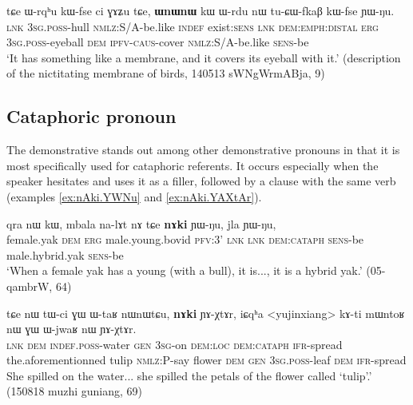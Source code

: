 \begin{exe}
\ex \label{ex:WnWnW.kW}
 \gll
tɕe ɯ-rqʰu kɯ-fse ci ɣɤʑu tɕe, \textbf{ɯnɯnɯ} kɯ ɯ-rdu nɯ tu-ɕɯ-fkaβ kɯ-fse ɲɯ-ŋu. \\
\textsc{lnk} \textsc{3sg.poss}-hull \textsc{nmlz}:S/A-be.like \textsc{indef}  exist:\textsc{sens} \textsc{lnk} \textsc{dem:emph:distal} \textsc{erg} \textsc{3sg.poss}-eyeball \textsc{dem} \textsc{ipfv}-\textsc{caus}-cover  \textsc{nmlz}:S/A-be.like \textsc{sens}-be \\
\glt `It has something like a membrane, and it covers its eyeball with it.' (description of the nictitating membrane of birds, 140513 sWNgWrmABja, 9)
\end{exe}

\subsection{Cataphoric pronoun} \label{sec:cataph.pron}
The demonstrative  stands out among other demonstrative pronouns in that it is most specifically used for cataphoric referents. It occurs especially when the speaker hesitates and uses it as a filler, followed by a clause with the same verb  (examples \ref{ex:nAki.YWNu} and \ref{ex:nAki.YAXtAr}).

\begin{exe}
\ex \label{ex:nAki.YWNu}
 \gll
qra nɯ kɯ, mbala na-lɤt nɤ tɕe \textbf{nɤki} ɲɯ-ŋu, jla ɲɯ-ŋu, \\
female.yak \textsc{dem} \textsc{erg} male.young.bovid \textsc{pfv}:3' \textsc{lnk} \textsc{lnk} \textsc{dem:cataph} \textsc{sens}-be male.hybrid.yak \textsc{sens}-be \\
\glt `When a female yak has a young (with a bull), it is..., it is a hybrid yak.' (05-qambrW, 64)
\end{exe}

\begin{exe}
\ex \label{ex:nAki.YAXtAr}
 \gll tɕe nɯ tɯ-ci ɣɯ ɯ-taʁ nɯnɯtɕu, \textbf{nɤki} ɲɤ-χtɤr, iɕqʰa <yujinxiang> kɤ-ti mɯntoʁ nɯ ɣɯ  ɯ-jwaʁ nɯ ɲɤ-χtɤr.  \\
\textsc{lnk} \textsc{dem} \textsc{indef.poss}-water \textsc{gen} \textsc{3sg}-on \textsc{dem:loc} \textsc{dem:cataph} \textsc{ifr}-spread the.aforementionned tulip \textsc{nmlz}:P-say flower \textsc{dem} \textsc{gen} \textsc{3sg.poss}-leaf \textsc{dem} \textsc{ifr}-spread \\
\glt She spilled on the water...  she spilled the petals of the flower called `tulip'.' (150818 muzhi guniang, 69)
\end{exe}

